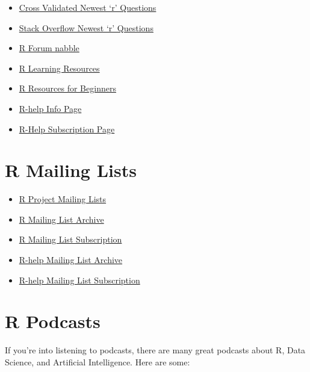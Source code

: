 \documentclass[]{book}
\providecommand{\tightlist}{%
  \setlength{\itemsep}{0pt}\setlength{\parskip}{0pt}}
\theoremstyle{definition}
\theoremstyle{definition}
\theoremstyle{definition}
\theoremstyle{remark}
\begin{document}
\begin{itemize}
\tightlist
\item
  \href{https://stats.stackexchange.com/questions/tagged/r}{Cross
  Validated \textbar{} Newest `r' Questions}
\item
  \href{https://stackoverflow.com/questions/tagged/r}{Stack Overflow
  \textbar{} Newest `r' Questions}
\item
  \href{http://r.789695.n4.nabble.com/}{R Forum \textbar{} nabble}
\item
  \href{http://r.stuzog.com/R_Learning_Resources.html}{R Learning
  Resources}
\item
  \href{http://www.introductoryr.co.uk/R_Resources_for_Beginners.html}{R
  Resources for Beginners}
\item
  \href{https://stat.ethz.ch/mailman/listinfo/r-help}{R-help Info Page}
\item
  \href{http://r.789695.n4.nabble.com/mailing_list/MailingListOptions.jtp?forum=789696}{R-Help
  Subscription Page}
\end{itemize}

\hypertarget{r-mailing-lists}{%
\section{R Mailing Lists}\label{r-mailing-lists}}

\begin{itemize}
\tightlist
\item
  \href{https://www.r-project.org/mail.html}{R Project Mailing Lists}
\item
  \href{http://r.789695.n4.nabble.com/}{R Mailing List Archive}
\item
  \href{http://r.789695.n4.nabble.com/template/NamlServlet.jtp?macro=start_registration_page\&nextUrl=http\%3A\%2F\%2Fr.789695.n4.nabble.com\%2F}{R
  Mailing List Subscription}
\item
  \href{http://r.789695.n4.nabble.com/R-help-f789696.html}{R-help
  \textbar{} Mailing List Archive}
\item
  \href{https://stat.ethz.ch/mailman/listinfo/r-help}{R-help \textbar{}
  Mailing List Subscription}
\end{itemize}

\hypertarget{r-podcasts}{%
\section{R Podcasts}\label{r-podcasts}}

If you're into listening to podcasts, there are many great podcasts
about R, Data Science, and Artificial Intelligence. Here are some:
\end{document}
